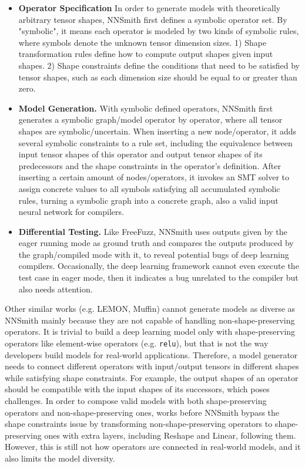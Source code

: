 \documentclass{article}
\begin{document}
\begin{itemize}
    \item \textbf{Operator Specification} In order to generate models with theoretically arbitrary tensor shapes, NNSmith first defines a symbolic operator set. By "symbolic", it means each operator is modeled by two kinds of symbolic rules, where symbols denote the unknown tensor dimension sizes. 1) Shape transformation rules define how to compute output shapes given input shapes. 2) Shape constraints define the conditions that need to be satisfied by tensor shapes, such as each dimension size should be equal to or greater than zero.
    \item \textbf{Model Generation.} With symbolic defined operators, NNSmith first generates a symbolic graph/model operator by operator, where all tensor shapes are symbolic/uncertain. When inserting a new node/operator, it adds several symbolic constraints to a rule set, including the equivalence between input tensor shapes of this operator and output tensor shapes of its predecessors and the shape constraints in the operator's definition. After inserting a certain amount of nodes/operators, it invokes an SMT solver to assign concrete values to all symbols satisfying all accumulated symbolic rules, turning a symbolic graph into a concrete graph, also a valid input neural network for compilers.
    \item \textbf{Differential Testing.} Like FreeFuzz, NNSmith uses outputs given by the eager running mode as ground truth and compares the outputs produced by the graph/compiled mode with it, to reveal potential bugs of deep learning compilers. Occasionally, the deep learning framework cannot even execute the test case in eager mode, then it indicates a bug unrelated to the compiler but also needs attention.
\end{itemize}

Other similar works (e.g. LEMON, Muffin) cannot generate models as diverse as NNSmith mainly because they are not capable of handling non-shape-preserving operators. It is trivial to build a deep learning model only with shape-preserving operators like element-wise operators (e.g. \texttt{relu}), but that is not the way developers build models for real-world applications. Therefore, a model generator needs to connect different operators with input/output tensors in different shapes while satisfying shape constraints. For example, the output shapes of an operator should be compatible with the input shapes of its successors, which poses challenges. In order to compose valid models with both shape-preserving operators and non-shape-preserving ones, works before NNSmith bypass the shape constraints issue by transforming non-shape-preserving operators to shape-preserving ones with extra layers, including Reshape and Linear, following them. However, this is still not how operators are connected in real-world models, and it also limits the model diversity.
\end{document}
